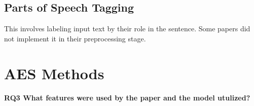 \documentclass{article}
\begin{document}
\subsection{Parts of Speech Tagging}
This involves labeling input text by their role in the sentence. Some papers did not implement it in their preprocessing stage.


\section{AES Methods}
\textbf{RQ3 What features were used by the paper and the model utulized?} \\
\end{document}
